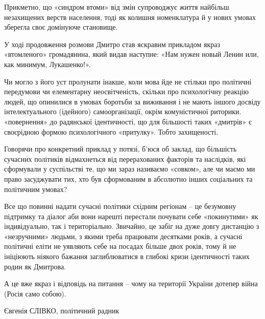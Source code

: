 Прикметно, що «синдром втоми» від змін супроводжує життя найбільш незахищених
верств населення, тоді як колишня номенклатура й у нових умовах зберегла своє
домінуюче становище.

У ході продовження розмови Дмитро став яскравим прикладом якраз «втомленого»
громадянина, який видав наступне: «Нам нужен новый Ленин или, как минимум,
Лукашенко!».

Чи могло з його уст пролунати інакше, коли мова йде не стільки про політичні
передумови чи елементарну неосвітченість, скільки про психологічну реакцію
людей, що опинилися в умовах боротьби за виживання і не мають іншого досвіду
інтелектуального (ідейного) самоорганізації, окрім комуністичної риторики.
«повернення» до радянської ідентичності, що для більшості таких «дмитрів» є
своєрідною формою психологічного «притулку». Тобто захищеності.

Говорячи про конкретний приклад у потязі, б’юся об заклад, що більшість
сучасних політиків відмахнеться від перерахованих факторів та наслідків, які
сформували у суспільстві те, що ми зараз називаємо «совком», але чи маємо ми
право засуджувати тих, хто був сформованим в абсолютно інших соціальних та
політичним умовах?

Все що повинні надати сучасні політики східним регіонам – це безумовну
підтримку та діалог аби вони нарешті перестали почувати себе «покинутими» як
індивідуально, так і територіально. Звичайно, це забіг на дуже довгу дистанцію
з «незручними» людьми, з якими треба працювати десятками років, а сучасні
політичні еліти не уявляють себе на посадах більше двох років, тому й не
ініціюють ніякого бажання заглиблюватися в глибокі кризи ідентичності таких
родин як Дмитрова.

А це вже якраз і відповідь на питання – чому на території України дотепер війна
(Росія само собою).

Євгенія СЛІВКО, політичний радник
